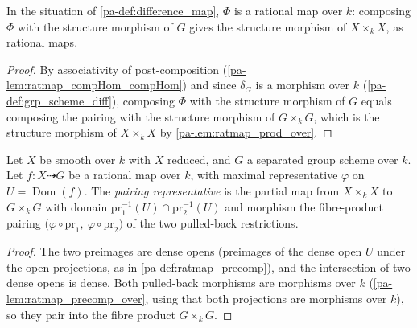 \begin{lemma}
  \label{pa-lem:difference_map_over}
  \leanok

  In the situation of \ref{pa-def:difference_map}, \(\Phi\) is a rational map over
  \(k\): composing \(\Phi\) with the structure morphism of \(G\) gives the
  structure morphism of \(X \times_k X\), as rational maps.
\end{lemma}
\begin{proof}
  \leanok
  By associativity of post-composition (\ref{pa-lem:ratmap_compHom_compHom}) and
  since \(\delta_G\) is a morphism over \(k\) (\ref{pa-def:grp_scheme_diff}),
  composing \(\Phi\) with the structure morphism of \(G\) equals composing the
  pairing with the structure morphism of \(G \times_k G\), which is the
  structure morphism of \(X \times_k X\) by \ref{pa-lem:ratmap_prod_over}.
\end{proof}

\begin{definition}
  \label{pa-def:difference_pairing}
  \leanok

  Let \(X\) be smooth over \(k\) with \(X\) reduced, and \(G\) a separated group
  scheme over \(k\). Let \(f : X \dashrightarrow G\) be a rational map over
  \(k\), with maximal representative \(\varphi\) on
  \(U = \operatorname{Dom}(f)\). The \emph{pairing representative} is the
  partial map from \(X \times_k X\) to \(G \times_k G\) with domain
  \(\mathrm{pr}_1^{-1}(U) \cap \mathrm{pr}_2^{-1}(U)\) and morphism the
  fibre-product pairing
  \(\bigl(\varphi \circ \mathrm{pr}_1,\ \varphi \circ \mathrm{pr}_2\bigr)\)
  of the two pulled-back restrictions.
\end{definition}
\begin{proof}
  \leanok
  The two preimages are dense opens (preimages of the dense open \(U\) under
  the open projections, as in \ref{pa-def:ratmap_precomp}), and the intersection of
  two dense opens is dense. Both pulled-back morphisms are morphisms over
  \(k\) (\ref{pa-lem:ratmap_precomp_over}, using that both projections are
  morphisms over \(k\)), so they pair into the fibre product
  \(G \times_k G\).
\end{proof}

